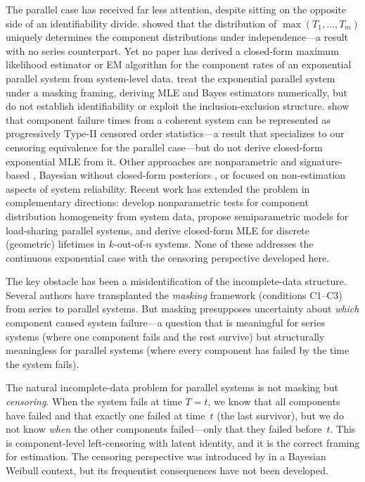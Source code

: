 The parallel case has received far less attention, despite sitting on
the opposite side of an identifiability divide.  \citet{BasuGhosh1980}
showed that the distribution of $\max(T_1, \ldots, T_m)$ uniquely
determines the component distributions under independence---a result
with no series counterpart.  Yet no paper has derived a closed-form
maximum likelihood estimator or EM algorithm for the component rates
of an exponential parallel system from system-level data.
\citet{SarhanElBassiouny2003} treat the exponential parallel system
under a masking framing, deriving MLE and Bayes estimators
numerically, but do not establish identifiability or exploit the
inclusion-exclusion structure.  \citet{CramerNavarro2015} show that
component failure times from a coherent system can be represented as
progressively Type-II censored order statistics---a result that
specializes to our censoring equivalence for the parallel case---but
do not derive closed-form exponential MLE from it.  Other approaches
are nonparametric and signature-based
\citep{BhattacharyaSamaniego2010, NgNavarroBalakrishnan2017,
YangNgBalakrishnan2019, Asadi2020}, Bayesian without closed-form
posteriors \citep{BheringPereiraPolpo2014}, or focused on
non-estimation aspects of system reliability.
Recent work has extended the problem in complementary directions:
\citet{QuNgMoon2024a,QuNgMoon2024b} develop nonparametric tests for
component distribution homogeneity from system data,
\citet{BiswasGangulyMitra2025} propose semiparametric models for
load-sharing parallel systems, and \citet{Jasinski2023,Jasinski2024}
derive closed-form MLE for discrete (geometric) lifetimes in
$k$-out-of-$n$ systems.  None of these addresses the continuous
exponential case with the censoring perspective developed here.

The key obstacle has been a misidentification of the incomplete-data
structure.  Several authors
\citep{LiuShiZhangBai2017, RodriguesPereiraBheringPolpo2018,
Sarhan2001} have transplanted the \emph{masking} framework
(conditions C1--C3) from series to parallel systems.  But masking
presupposes uncertainty about \emph{which} component caused system
failure---a question that is meaningful for series systems (where one
component fails and the rest survive) but structurally meaningless for
parallel systems (where every component has failed by the time the
system fails).

The natural incomplete-data problem for parallel systems is not masking
but \emph{censoring}.  When the system fails at time $T = t$, we know
that all components have failed and that exactly one failed at time~$t$
(the last survivor), but we do not know \emph{when} the other
components failed---only that they failed before~$t$.  This is
component-level left-censoring with latent identity, and it is the
correct framing for estimation.  The censoring perspective was
introduced by \citet{BheringPereiraPolpo2014} in a Bayesian Weibull
context, but its frequentist consequences have not been developed.

